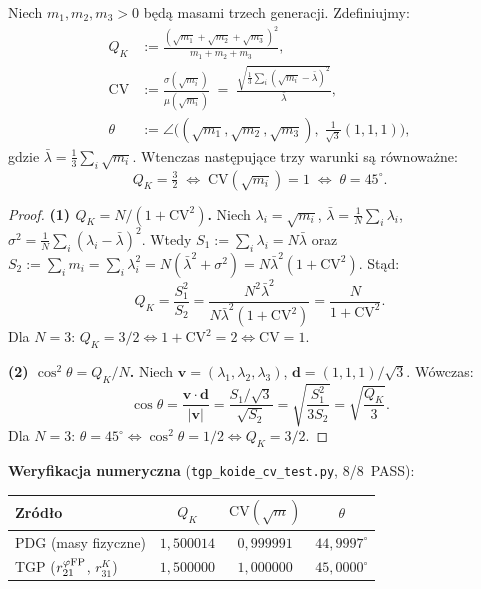 \begin{theorem}[$Q_K = 3/2 \Leftrightarrow \mathrm{CV}(\sqrt{m}) = 1
  \Leftrightarrow \theta = 45^\circ$]%
\label{thm:T-QK-CV}
Niech $m_1, m_2, m_3 > 0$ b\k{e}d\k{a} masami trzech generacji.
Zdefiniujmy:
\begin{align}
  Q_K &:= \frac{(\sqrt{m_1}+\sqrt{m_2}+\sqrt{m_3})^2}{m_1+m_2+m_3},
    \label{eq:T-QK-def2}\\
  \mathrm{CV} &:= \frac{\sigma(\sqrt{m_i})}{\mu(\sqrt{m_i})}
    \;=\; \frac{\sqrt{\tfrac{1}{3}\sum_i(\sqrt{m_i}-\bar\lambda)^2}}{\bar\lambda},
    \label{eq:T-CV-def}\\
  \theta &:= \angle\!\bigl((\sqrt{m_1},\sqrt{m_2},\sqrt{m_3}),\;
    \tfrac{1}{\sqrt3}(1,1,1)\bigr),
    \label{eq:T-angle-def}
\end{align}
gdzie $\bar\lambda = \tfrac{1}{3}\sum_i\sqrt{m_i}$.
Wtenczas nast\k{e}puj\k{a}ce trzy warunki s\k{a} r\'ownowa\.zne:
\begin{equation}\label{eq:T-triple}
  \boxed{Q_K = \tfrac{3}{2}
  \;\iff\;
  \mathrm{CV}(\sqrt{m_i}) = 1
  \;\iff\;
  \theta = 45^\circ.}
\end{equation}

\begin{proof}
\textbf{(1) $Q_K = N/(1+\mathrm{CV}^2)$.}
Niech $\lambda_i = \sqrt{m_i}$, $\bar\lambda = \tfrac{1}{N}\sum_i\lambda_i$,
$\sigma^2 = \tfrac{1}{N}\sum_i(\lambda_i-\bar\lambda)^2$.
Wtedy $S_1 := \sum_i\lambda_i = N\bar\lambda$ oraz
$S_2 := \sum_i m_i = \sum_i\lambda_i^2 = N(\bar\lambda^2+\sigma^2)
  = N\bar\lambda^2(1+\mathrm{CV}^2)$.
St\k{a}d:
\begin{equation}
  Q_K = \frac{S_1^2}{S_2}
  = \frac{N^2\bar\lambda^2}{N\bar\lambda^2(1+\mathrm{CV}^2)}
  = \frac{N}{1+\mathrm{CV}^2}.
\end{equation}
Dla $N = 3$: $Q_K = 3/2 \Leftrightarrow 1+\mathrm{CV}^2 = 2
  \Leftrightarrow \mathrm{CV} = 1$.

\textbf{(2) $\cos^2\theta = Q_K/N$.}
Niech $\mathbf{v} = (\lambda_1,\lambda_2,\lambda_3)$,
$\mathbf{d} = (1,1,1)/\sqrt{3}$.
W\'owczas:
\begin{equation}
  \cos\theta = \frac{\mathbf{v}\cdot\mathbf{d}}{|\mathbf{v}|}
  = \frac{S_1/\sqrt{3}}{\sqrt{S_2}}
  = \sqrt{\frac{S_1^2}{3S_2}}
  = \sqrt{\frac{Q_K}{3}}.
\end{equation}
Dla $N=3$: $\theta = 45^\circ \Leftrightarrow \cos^2\theta = 1/2
  \Leftrightarrow Q_K = 3/2$.
\end{proof}

\textbf{Weryfikacja numeryczna} (\texttt{tgp\_koide\_cv\_test.py}, 8/8~PASS):
\begin{center}\footnotesize
\begin{tabular}{lccc}
\toprule
Zr\'od\l{}o & $Q_K$ & $\mathrm{CV}(\sqrt{m})$ & $\theta$ \\
\midrule
PDG (masy fizyczne) & $1{,}500014$ & $0{,}999991$ & $44{,}9997^\circ$ \\
TGP ($r_{21}^{\varphi{\rm FP}}$, $r_{31}^K$) & $1{,}500000$ & $1{,}000000$ & $45{,}0000^\circ$ \\
\bottomrule
\end{tabular}
\end{center}
\end{theorem}

